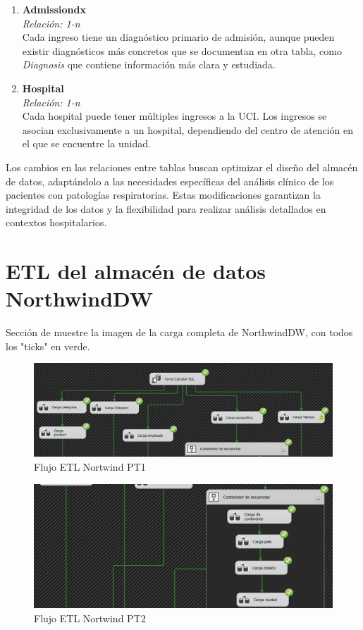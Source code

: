 \documentclass[12pt, a4paper, twoside]{article}
\begin{document}
\begin{enumerate}
		\item \textbf{Admissiondx} \\
		\textit{Relación: 1-n} \\
		Cada ingreso tiene un diagnóstico primario de admisión, aunque pueden existir diagnósticos  más concretos que se documentan en otra tabla, como \textit{Diagnosis} que contiene información más clara y estudiada.
		
		\item \textbf{Hospital} \\
		\textit{Relación: 1-n} \\
		Cada hospital puede tener múltiples ingresos a la UCI. Los ingresos se asocian exclusivamente a un hospital, dependiendo del centro de atención en el que se encuentre la unidad.
	\end{enumerate}

	

	
	Los cambios en las relaciones entre tablas buscan optimizar el diseño del almacén de datos, adaptándolo a las necesidades específicas del análisis clínico de los pacientes con patologías respiratorias. Estas modificaciones garantizan la integridad de los datos y la flexibilidad para realizar análisis detallados en contextos hospitalarios. 
	
	
	\section{ETL del almacén de datos NorthwindDW}
	
	Sección de muestre la imagen de la carga completa de NorthwindDW, con todos los "ticks" en verde. 
	
	\begin{figure}[H]
		\centering
		\includegraphics[width=1\textwidth]{image/flujo_north_1.png}
		\caption{Flujo ETL Nortwind PT1}
		\label{fig:5}
	\end{figure}
	
	\begin{figure}[H]
		\centering
		\includegraphics[width=1\textwidth]{image/flujo_north_2.png}
		\caption{Flujo ETL Nortwind PT2}
		\label{fig:6}
	\end{figure}
	
\end{document}

